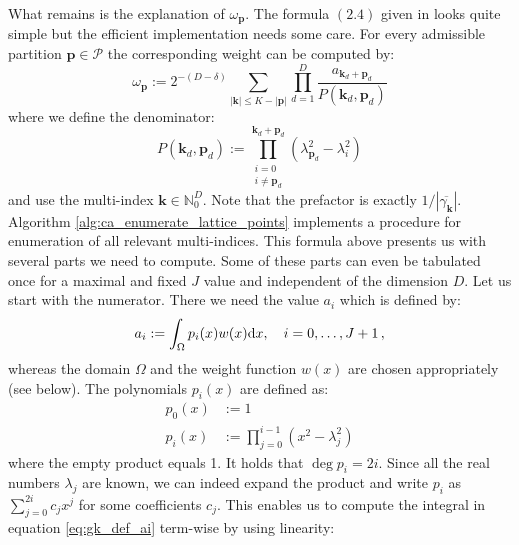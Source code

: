 \documentclass[a4paper,10pt]{article}
\begin{document}
What remains is the explanation of $\omega_\mathbf{p}$. The formula $(2.4)$
given in \cite{genz} looks quite simple but the efficient implementation needs
some care. For every admissible partition $\mathbf{p} \in \mathcal{P}$ the
corresponding weight can be computed by:
\begin{equation} \label{eq:gk_weight_def}
  \omega_{\mathbf{p}} := 2^{-(D-\delta)}
                         \sum_{|\mathbf{k}| \leq K - |\mathbf{p}|}
                         \prod_{d=1}^{D}
                           \frac{a_{\mathbf{k}_{d}+\mathbf{p}_{d}}}{P(\mathbf{k}_{d},\mathbf{p}_{d})}
\end{equation}
where we define the denominator:
\begin{equation} \label{eq:gk_weight_def_denom}
  P(\mathbf{k}_{d},\mathbf{p}_{d}) :=
  \prod_{\substack{i=0 \\
                   i\neq\mathbf{p}_{d}}}
       ^{\mathbf{k}_{d}+\mathbf{p}_{d}}
    \left( \lambda_{\mathbf{p}_{d}}^{2}-\lambda_{i}^{2} \right)
\end{equation}
and use the multi-index $\mathbf{k} \in \mathbb{N}_{0}^{D}$. Note that the
prefactor is exactly $1 / |\overline{\gamma_\mathbf{k}}|$.
Algorithm \ref{alg:ca_enumerate_lattice_points} implements a procedure
for enumeration of all relevant multi-indices.
This formula above presents us with several parts we need to compute.
Some of these parts can even be tabulated once for a maximal and
fixed $J$ value and independent of the dimension $D$.
Let us start with the numerator. There we need the value $a_i$ which
is defined by:
\begin{equation} \label{eq:gk_def_ai}
  a_{i} := \int_\Omega p_{i}(x) w(x) \mathrm{d}x, \quad i = 0, \ldots, J+1 \,,
\end{equation}
whereas the domain $\Omega$ and the weight function $w(x)$ are chosen
appropriately (see below). The polynomials $p_{i}(x)$ are defined as:
\begin{equation}
\begin{split}
  p_{0}(x) & := 1 \\
  p_{i}(x) & := \prod_{j=0}^{i-1} \left(x^{2} - \lambda_{j}^{2}\right)
\end{split}
\end{equation}
where the empty product equals 1. It holds that $\deg p_i = 2i$.
Since all the real numbers $\lambda_{j}$ are known, we can indeed
expand the product and write $p_i$ as $\sum_{j=0}^{2i} c_j x^j$
for some coefficients $c_j$. This enables us to compute the integral
in equation \eqref{eq:gk_def_ai} term-wise by using linearity:
\end{document}
